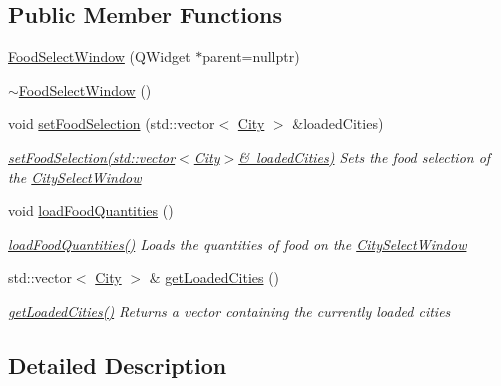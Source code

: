 \subsection*{Public Member Functions}
\begin{DoxyCompactItemize}
\item 
\mbox{\hyperlink{class_food_select_window_a406c941abcadeffb28129c9c54f683c7}{Food\+Select\+Window}} (Q\+Widget $\ast$parent=nullptr)
\item 
\mbox{\hyperlink{class_food_select_window_ad9a2c1de2179eb3ce5e1e02a8d4515ba}{$\sim$\+Food\+Select\+Window}} ()
\item 
void \mbox{\hyperlink{class_food_select_window_a6df884d5b39d16a2708f8bcae205ecd5}{set\+Food\+Selection}} (std\+::vector$<$ \mbox{\hyperlink{class_city}{City}} $>$ \&loaded\+Cities)
\begin{DoxyCompactList}\small\item\em \mbox{\hyperlink{class_food_select_window_a6df884d5b39d16a2708f8bcae205ecd5}{set\+Food\+Selection(std\+::vector$<$\+City$>$\& loaded\+Cities)}} Sets the food selection of the \mbox{\hyperlink{class_city_select_window}{City\+Select\+Window}} \end{DoxyCompactList}\item 
void \mbox{\hyperlink{class_food_select_window_a608403f9ed5796c1a1d0ac034296bc05}{load\+Food\+Quantities}} ()
\begin{DoxyCompactList}\small\item\em \mbox{\hyperlink{class_food_select_window_a608403f9ed5796c1a1d0ac034296bc05}{load\+Food\+Quantities()}} Loads the quantities of food on the \mbox{\hyperlink{class_city_select_window}{City\+Select\+Window}} \end{DoxyCompactList}\item 
std\+::vector$<$ \mbox{\hyperlink{class_city}{City}} $>$ \& \mbox{\hyperlink{class_food_select_window_a2a32ba559351db37a46af24cad9cba5d}{get\+Loaded\+Cities}} ()
\begin{DoxyCompactList}\small\item\em \mbox{\hyperlink{class_food_select_window_a2a32ba559351db37a46af24cad9cba5d}{get\+Loaded\+Cities()}} Returns a vector containing the currently loaded cities \end{DoxyCompactList}\end{DoxyCompactItemize}


\subsection{Detailed Description}


